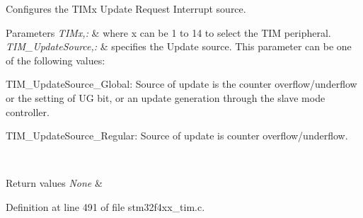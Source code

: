 Configures the T\-I\-Mx Update Request Interrupt source. 


\begin{DoxyParams}{Parameters}
{\em T\-I\-Mx,\-:} & where x can be 1 to 14 to select the T\-I\-M peripheral. \\
\hline
{\em T\-I\-M\-\_\-\-Update\-Source,\-:} & specifies the Update source. This parameter can be one of the following values\-: \begin{DoxyItemize}
\item T\-I\-M\-\_\-\-Update\-Source\-\_\-\-Global\-: Source of update is the counter overflow/underflow or the setting of U\-G bit, or an update generation through the slave mode controller. \item T\-I\-M\-\_\-\-Update\-Source\-\_\-\-Regular\-: Source of update is counter overflow/underflow. \end{DoxyItemize}
\\
\hline
\end{DoxyParams}

\begin{DoxyRetVals}{Return values}
{\em None} & \\
\hline
\end{DoxyRetVals}


Definition at line 491 of file stm32f4xx\-\_\-tim.\-c.

